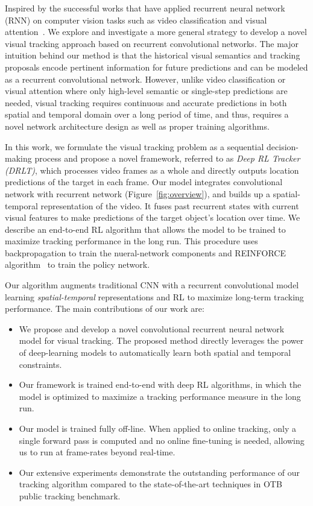 \documentclass[10pt,twocolumn,letterpaper]{article}
\begin{document}
Inspired by the successful works that have applied recurrent neural network (RNN) on computer vision tasks such as video classification and visual attention~\cite{donahue2015long,mnih2014recurrent}. We explore and investigate a more general strategy to develop a novel visual tracking approach based on recurrent convolutional networks. The major intuition behind our method is that the historical visual semantics and tracking proposals encode pertinent information for future predictions and can be modeled as a recurrent convolutional network. However, unlike video classification or visual attention where only high-level semantic or single-step predictions are needed, visual tracking requires continuous and accurate predictions in both spatial and temporal domain over a long period of time, and thus, requires a novel network architecture design as well as proper training algorithms.

In this work, we formulate the visual tracking problem as a sequential decision-making process and propose a novel framework, referred to as \emph{Deep RL Tracker (DRLT)}, which processes video frames as a whole and directly outputs location predictions of the target in each frame. Our model integrates convolutional network with recurrent network (Figure~\ref{fig:overview}), and builds up a spatial-temporal representation of the video. It fuses past recurrent states with current visual features to make predictions of the target object's location over time. We describe an end-to-end RL algorithm that allows the model to be trained to maximize tracking performance in the long run. This procedure uses backpropagation to train the nueral-network components and REINFORCE algorithm~\cite{williams1992simple} to train the policy network.

Our algorithm augments traditional CNN with a recurrent convolutional model learning \emph{spatial-temporal} representations and RL to maximize long-term tracking performance. The main contributions of our work are:

\begin{itemize}
    \item We propose and develop a novel convolutional recurrent neural network model for visual tracking. The proposed method directly leverages the power of deep-learning models to automatically learn both spatial and temporal constraints. 
    \item Our framework is trained end-to-end with deep RL algorithms, in which the model is optimized to maximize a tracking performance measure in the long run. 
    \item Our model is trained fully off-line. When applied to online tracking, only a single forward pass is computed and no online fine-tuning is needed, allowing us to run at frame-rates beyond real-time.
    \item Our extensive experiments demonstrate the outstanding performance of our tracking algorithm compared to the state-of-the-art techniques in OTB~\cite{wu2013online} public tracking benchmark.
\end{itemize}
\end{document}
